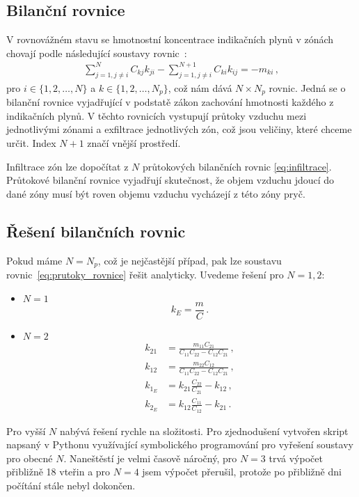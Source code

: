 \subsection{Bilanční rovnice}
V rovnovážném stavu se hmotnostní koncentrace indikačních plynů v zónách chovají podle následující soustavy rovnic~\cite{japonci}:
\begin{align}
    \sum_{j=1,j\neq i}^{N}C_{kj}k_{ji}-\sum_{j=1,j\neq i}^{N+1}C_{ki}k_{ij}=-m_{ki}\,,
    \label{eq:prutoky_rovnice}
\end{align}
pro $i\in\{1,2, \ldots, N\}$ a $k\in\{1,2,\ldots, N_p\}$, což nám dává $N\times N_p$ rovnic. Jedná se o bilanční rovnice vyjadřující v podstatě zákon zachování hmotnosti každého z indikačních plynů. V těchto rovnicích vystupují průtoky vzduchu mezi jednotlivými zónami a exfiltrace jednotlivých zón, což jsou veličiny, které chceme určit. Index $N+1$ značí vnější prostředí.

Infiltrace zón lze dopočítat z $N$ průtokových bilančních rovnic \eqref{eq:infiltrace}. Průtokové bilanční rovnice vyjadřují skutečnost, že objem vzduchu jdoucí do dané zóny musí být roven objemu vzduchu vycházejí z této zóny pryč. 

\subsection{Řešení bilančních rovnic}
Pokud máme $N=N_p$, což je nejčastější případ, pak lze soustavu rovnic~\eqref{eq:prutoky_rovnice} řešit analyticky. Uvedeme řešení pro $N=1, 2$:
\begin{itemize}
    \item $N=1$
        \begin{equation}
            k_E=\frac{m}{C}\,.
        \end{equation}
    \item $N=2$
        \begin{align}
            k_{21}&=\frac{m_{11}C_{21}}{C_{11}C_{22}-C_{12}C_{21}}\,, \\
            k_{12}&=\frac{m_{22}C_{12}}{C_{11}C_{22}-C_{12}C_{21}}\,, \\
            k_{1_E}&=k_{21}\frac{C_{22}}{C_{21}}-k_{12}\,,\\
            k_{2_E}&=k_{12}\frac{C_{11}}{C_{12}}-k_{21}\,.
        \end{align}
\end{itemize}
Pro vyšší $N$ nabývá řešení rychle na složitosti. Pro zjednodušení vytvořen skript napsaný v Pythonu využívající symbolického programování pro vyřešení soustavy pro obecné $N$. Naneštěstí je velmi časově náročný, pro $N=3$ trvá výpočet přibližně 18 vteřin a pro $N=4$ jsem výpočet přerušil, protože po přibližně dni počítání stále nebyl dokončen.


